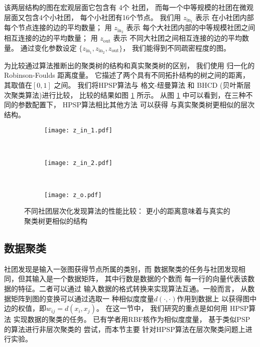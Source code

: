 该两层结构的图在宏观层面它包含有 4个 社团，
而每一个中等规模的社团在微观层面又包含4个小社团，
每个小社团有16个节点。
我们用 $z_{\mathrm{in}_1}$ 表示
在小社团内部每个节点连接的边的平均数量；
用 $z_{\mathrm{in}_2}$ 表示
每个大社团内部的中等规模社团之间相互连接的边的平均数量；
用 $z_{\mathrm{out}}$ 表示
不同大社团之间相互连接的边的平均数量。
通过变化参数设定
$\{z_{\mathrm{in}_1}, z_{\mathrm{in}_2}, z_{\mathrm{out}} \}$，
我们能得到不同疏密程度的图。

为比较通过算法推断出的聚类树的结构和真实聚类树的区别，
我们使用 归一化的 Robinson-Foulds 距离度量\cite{ROBINSON1981131}。
它描述了两个具有不同拓扑结构的树之间的距离，
其取值在$[0,1]$ 之间。
我们将HPSP算法与
格文-纽曼算法\cite{girvan2002community}
和 BHCD (贝叶斯层次聚类算法\cite{blundell2013bhcd})进行比较，
比较的结果如图 \ref{fig:cdr} 所示。
从图 \ref{fig:cdr} 中可以看到，在三种不同的参数配置下，
HPSP算法相比其他方法 可以获得
与真实聚类树更相似的层次结构。

\begin{figure}
	\centering
	\begin{subfigure}{0.33\textwidth}
		\texttt{[image: z\_in\_1.pdf]}
		\caption{}
	\end{subfigure}~
	\begin{subfigure}{0.33\textwidth}
		\texttt{[image: z\_in\_2.pdf]}
		\caption{}
	\end{subfigure}~
	\begin{subfigure}{0.33\textwidth}
		\texttt{[image: z\_o.pdf]}
		\caption{}
	\end{subfigure}
	\caption{不同社团层次化发现算法的性能比较：
  更小的距离意味着与真实的聚类树更相似的结构}
  \label{fig:cdr}
\end{figure}

\subsection{数据聚类}
\label{sec:data_clustering}
社团发现是输入一张图获得节点所属的类别，而
数据聚类的任务与社团发现相同，但其输入是一个数据矩阵，
其中行数是数据的个数而
每一行的向量代表该数据的特征。二者可以通过
输入数据的格式转换来实现算法互通。一般而言，
从数据矩阵到图的变换可以通过选取一
种相似度度量$d(\cdot,\cdot)$作用到数据上
以获得图中边的权值，即$w_{ij}=d(x_i, x_j)$。
在这一节中，
我们研究的重点是如何用
HPSP算法 实现数据的聚类的任务。
已有学者用RBF核作为相似度度量，
基于类似PSP的算法进行非层次聚类的
尝试\cite{mac}，而本节主要
针对HPSP算法在层次聚类问题上进行实验。

